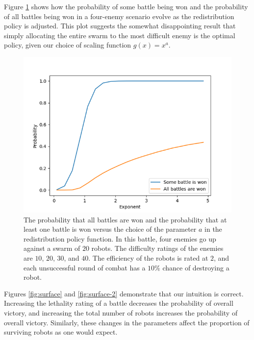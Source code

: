 \documentclass[11pt]{article}
\theoremstyle{definition}
\begin{document}
Figure \ref{fig:some-all-battle-won} shows how the probability of some battle
being won and the probability of all battles being won in a four-enemy scenario
evolve as the redistribution policy is adjusted.
%
This plot suggests the somewhat disappointing result that simply allocating the
entire swarm to the most difficult enemy is the optimal policy, given our
choice of scaling function $g(x) = x^a$.

\begin{figure}
    \begin{center}
        \includegraphics[width=\textwidth]{../figs/some-all-probability-vs-exp.png}
    \end{center}
    \caption{
        The probability that all battles are won and the probability that at
        least one battle is won versus the choice of the parameter $a$ in the
        redistribution policy function.
        In this battle, four enemies go up against a swarm of $20$ robots.
        The difficulty ratings of the enemies are $10$, $20$, $30$, and $40$.
        The efficiency of the robots is rated at $2$, and each unsuccessful
        round of combat has a $10\%$ chance of destroying a robot.
    }
    \label{fig:some-all-battle-won}
\end{figure}

Figures \ref{fig:surface} and \ref{fig:surface-2} demonstrate that our
intuition is correct.
Increasing the lethality rating of a battle decreases the probability of
overall victory, and increasing the total number of robots increases the
probability of overall victory.
Similarly, these changes in the parameters affect the proportion of surviving
robots as one would expect.
\end{document}
